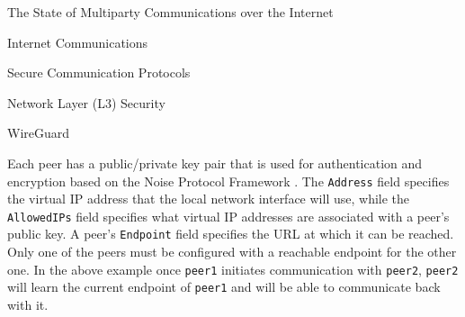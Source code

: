 \begin{frame}[fragile]{The State of Multiparty Communications over the
Internet}
\begin{block}{Internet Communications}
\begin{block}{Secure Communication Protocols}
\begin{block}{Network Layer (L3) Security}
\begin{block}{WireGuard}
\begin{Shaded}
\begin{Highlighting}[]
\KeywordTok{[Peer]}
\OtherTok{=}
\OtherTok{=}
\OtherTok{=}
\end{Highlighting}
\end{Shaded}

\begin{Shaded}
\begin{Highlighting}[]
\KeywordTok{[Interface]}
\OtherTok{=}
\OtherTok{=}\StringTok{ }
\OtherTok{=}

\KeywordTok{[Peer]}
\OtherTok{=}
\OtherTok{=}
\end{Highlighting}
\end{Shaded}

Each peer has a public/private key pair that is used for authentication
and encryption based on the Noise Protocol Framework
\autocite{noiseDocs}. The \texttt{Address} field specifies the virtual
IP address that the local network interface will use, while the
\texttt{AllowedIPs} field specifies what virtual IP addresses are
associated with a peer's public key. A peer's \texttt{Endpoint} field
specifies the URL at which it can be reached. Only one of the peers must
be configured with a reachable endpoint for the other one. In the above
example once \texttt{peer1} initiates communication with \texttt{peer2},
\texttt{peer2} will learn the current endpoint of \texttt{peer1} and
will be able to communicate back with it.

\end{block}
\end{block}
\end{block}


\end{block}
\end{frame}
